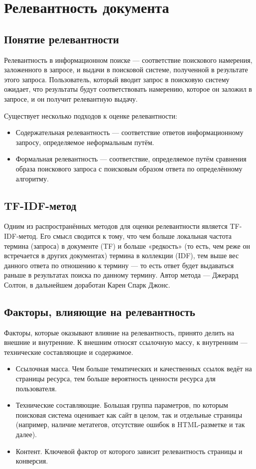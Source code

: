  \section{Релевантность документа}
 \subsection{Понятие релевантности}
 Релевантность в информационном поиске — соответствие поискового намерения, заложенного в запросе, и выдачи в поисковой системе, полученной в результате этого запроса. Пользователь, который вводит запрос в поисковую систему ожидает, что результаты будут соответствовать намерению, которое он заложил в запросе, и он получит релевантную выдачу.

Существует несколько подходов к оценке релевантности: 
\begin{itemize}
    \item Содержательная релевантность — соответствие ответов информационному запросу, определяемое неформальным путём. 
    \item Формальная релевантность — соответствие, определяемое путём сравнения образа поискового запроса с поисковым образом ответа по определённому алгоритму.
\end{itemize}

 \subsection{TF-IDF-метод}
Одним из распространённых методов для оценки релевантности является TF-IDF-метод. Его смысл сводится к тому, что чем больше локальная частота термина (запроса) в документе (TF) и больше «редкость» (то есть, чем реже он встречается в других документах) термина в коллекции (IDF), тем выше вес данного ответа по отношению к термину — то есть ответ будет выдаваться раньше в результатах поиска по данному термину. Автор метода — Джерард Солтон, в дальнейшем доработан Карен Спарк Джонс.

\subsection{Факторы, влияющие на релевантность}
Факторы, которые оказывают влияние на релевантность, принято делить на внешние и внутренние. К внешним относят ссылочную массу, к внутренним — технические составляющие и содержимое.

\begin{itemize}
    \item Ссылочная масса. Чем больше тематических и качественных ссылок ведёт на страницы ресурса, тем больше вероятность ценности ресурса для пользователя.
    \item Технические составляющие. Большая группа параметров, по которым поисковая система оценивает как сайт в целом, так и отдельные страницы (например, наличие метатегов, отсутствие ошибок в HTML-разметке и так далее).
    \item Контент. Ключевой фактор от которого зависит релевантность страницы и конверсия.
\end{itemize}

